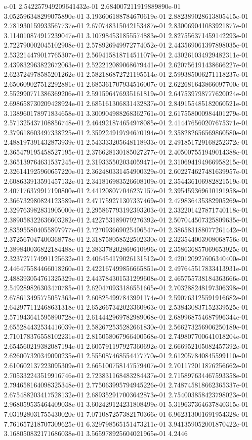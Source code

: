 e-01	2.542257949209641432e-01	2.684007211919889890e-01	3.052596348299075890e-01	3.193606188784670619e-01	2.882389028613805415e-01	2.781930159933567737e-01	2.670748315042153487e-01	2.830069041083921877e-01	3.114010874917239047e-01	3.107984531855574883e-01	2.827556371459142293e-01	2.722790002045102908e-01	2.578926949972774052e-01	2.443569061397898035e-01	2.532214479017765307e-01	2.569415818714511079e-01	2.430261034929482311e-01	2.439832963822672063e-01	2.522212089068679441e-01	2.620756191438666227e-01	2.623724978585201262e-01	2.582186872721195514e-01	2.599385006271118237e-01	2.650609027512292881e-01	2.685361707934516007e-01	2.622681643866097700e-01	2.552990771386369206e-01	2.591596476935161819e-01	2.647539798777620024e-01	2.698658730209428924e-01	2.685161306831432837e-01	2.849155485182060521e-01	3.138960178971834658e-01	3.300904988268362761e-01	2.617558000984401279e-01	2.571325437108856748e-01	2.464921874654978085e-01	2.414476560207675371e-01	2.379618603497338225e-01	2.359224919794670194e-01	2.358282656569860580e-01	2.488197391432873939e-01	2.543333205648118933e-01	2.491851729168252372e-01	2.365479195458527195e-01	2.376628130185027277e-01	2.405007551949014388e-01	2.365139764631537245e-01	2.319335502034059471e-01	2.310694194966958215e-01	2.326141925960657220e-01	2.362480331454900329e-01	2.602274627481639957e-01	2.608633913591457132e-01	2.341816983526608109e-01	2.354436106982821519e-01	2.407176379917190800e-01	2.441208077046237157e-01	2.395459369610191958e-01	2.366732980824123589e-01	2.471759271307337469e-01	2.479836435382905269e-01	2.329763982831905000e-01	2.295867793192393203e-01	2.332201427871740118e-01	2.389058322636603282e-01	2.422753189079276392e-01	2.507044507325809635e-01	2.835955804055897977e-01	2.727093669025496547e-01	2.386583188077261442e-01	2.372567047400368778e-01	2.318758058522502330e-01	2.323544003908068756e-01	2.389840036822184488e-01	2.383378202869610996e-01	2.358636857069653925e-01	2.323727174991125632e-01	2.406454179026131512e-01	2.420120927606340400e-01	2.446475584466018260e-01	2.422167499856665851e-01	2.497645517833413931e-01	2.488393054761325329e-01	2.443784301531299608e-01	2.465755738184363666e-01	2.549289826303470785e-01	2.620470933186551665e-01	2.703288248197306398e-01	2.678613495775057363e-01	2.608254997843991174e-01	2.590763125591916682e-01	2.642977112468631318e-01	2.652667342023360963e-01	2.538430837152339525e-01	2.571943641595890728e-01	2.614442969782989068e-01	2.689968754687996344e-01	2.655284432534416039e-01	2.582672535282661830e-01	2.566273256906250189e-01	2.710178376558102231e-01	2.815058067966400568e-01	2.749807700641018204e-01	2.654560219382087194e-01	2.605791197927360692e-01	2.666952105082457392e-01	2.626007320349090235e-01	2.555087468554477770e-01	2.612057840845599110e-01	2.610602137223095309e-01	2.665100758147579407e-01	2.701172011876256662e-01	2.705332243519916746e-01	2.723831168483284437e-01	2.715897634467593358e-01	2.794658164098325348e-01	2.775063995794945226e-01	2.748745818662365337e-01	2.675488203417528132e-01	2.689352917003642873e-01	2.754003858423798023e-01	2.968059535464409038e-01	3.602429124231808499e-01	5.319637364637840315e-01	7.031928031755430020e-01	7.071087257382170366e-01	6.962313001691954328e-01	7.761657218707309625e-01	6.329798565151473211e-01	3.941359052001870422e-01	3.168050832171686038e-01	3.565978925604021965e-01	4.2446